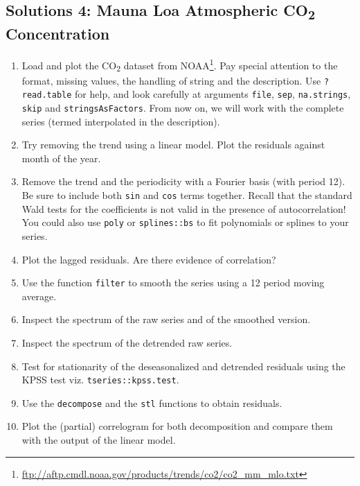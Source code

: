 \documentclass[]{book}
\providecommand{\tightlist}{%
  \setlength{\itemsep}{0pt}\setlength{\parskip}{0pt}}
\let\rmarkdownfootnote\footnote%
\def\footnote{\protect\rmarkdownfootnote}
\renewcommand{\href}[2]{#2\footnote{\url{#1}}}
\begin{document}
\hypertarget{solutions-4-mauna-loa-atmospheric-co2-concentration}{%
\subsection{\texorpdfstring{Solutions 4: Mauna Loa Atmospheric CO\textsubscript{2} Concentration}{Solutions 4: Mauna Loa Atmospheric CO2 Concentration}}\label{solutions-4-mauna-loa-atmospheric-co2-concentration}}

\begin{enumerate}
\def\labelenumi{\arabic{enumi}.}
\tightlist
\item
  Load and plot the CO\textsubscript{2} dataset from \href{ftp://aftp.cmdl.noaa.gov/products/trends/co2/co2_mm_mlo.txt}{NOAA}. Pay special attention to the format, missing values, the handling of string and the description. Use \texttt{?read.table} for help, and look carefully at arguments \texttt{file}, \texttt{sep}, \texttt{na.strings}, \texttt{skip} and \texttt{stringsAsFactors}. From now on, we will work with the complete series (termed interpolated in the description).
\item
  Try removing the trend using a linear model. Plot the residuals against month of the year.
\item
  Remove the trend and the periodicity with a Fourier basis (with period 12). Be sure to include both \texttt{sin} and \texttt{cos} terms together. Recall that the standard Wald tests for the coefficients is not valid in the presence of autocorrelation! You could also use \texttt{poly} or \texttt{splines::bs} to fit polynomials or splines to your series.
\item
  Plot the lagged residuals. Are there evidence of correlation?
\item
  Use the function \texttt{filter} to smooth the series using a 12 period moving average.
\item
  Inspect the spectrum of the raw series and of the smoothed version.
\item
  Inspect the spectrum of the detrended raw series.
\item
  Test for stationarity of the deseasonalized and detrended residuals using the KPSS test viz. \texttt{tseries::kpss.test}.
\item
  Use the \texttt{decompose} and the \texttt{stl} functions to obtain residuals.
\item
  Plot the (partial) correlogram for both decomposition and compare them with the output of the linear model.
\end{enumerate}
\end{document}
